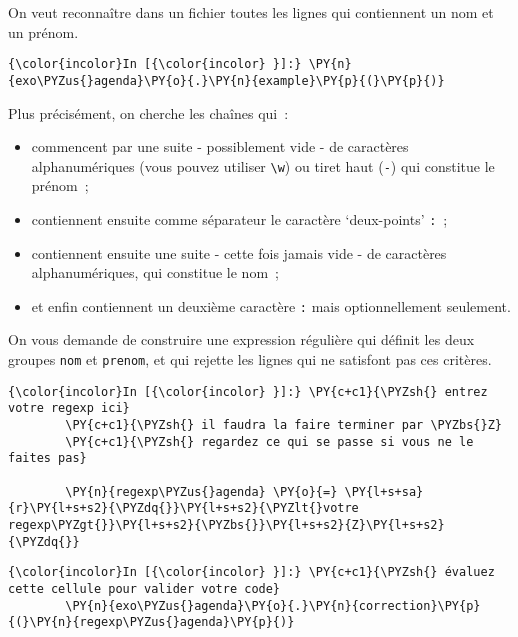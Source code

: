     On veut reconnaître dans un fichier toutes les lignes qui contiennent un
nom et un prénom.

    \begin{Verbatim}[commandchars=\\\{\}]
{\color{incolor}In [{\color{incolor} }]:} \PY{n}{exo\PYZus{}agenda}\PY{o}{.}\PY{n}{example}\PY{p}{(}\PY{p}{)}
\end{Verbatim}


    Plus précisément, on cherche les chaînes qui~:

\begin{itemize}
\tightlist
\item
  commencent par une suite - possiblement vide - de caractères
  alphanumériques (vous pouvez utiliser \texttt{\textbackslash{}w}) ou
  tiret haut (\texttt{-}) qui constitue le prénom~;
\item
  contiennent ensuite comme séparateur le caractère `deux-points'
  \texttt{:}~;
\item
  contiennent ensuite une suite - cette fois jamais vide - de caractères
  alphanumériques, qui constitue le nom~;
\item
  et enfin contiennent un deuxième caractère \texttt{:} mais
  optionnellement seulement.
\end{itemize}

    On vous demande de construire une expression régulière qui définit les
deux groupes \texttt{nom} et \texttt{prenom}, et qui rejette les lignes
qui ne satisfont pas ces critères.

    \begin{Verbatim}[commandchars=\\\{\}]
{\color{incolor}In [{\color{incolor} }]:} \PY{c+c1}{\PYZsh{} entrez votre regexp ici}
        \PY{c+c1}{\PYZsh{} il faudra la faire terminer par \PYZbs{}Z}
        \PY{c+c1}{\PYZsh{} regardez ce qui se passe si vous ne le faites pas}
        
        \PY{n}{regexp\PYZus{}agenda} \PY{o}{=} \PY{l+s+sa}{r}\PY{l+s+s2}{\PYZdq{}}\PY{l+s+s2}{\PYZlt{}votre regexp\PYZgt{}}\PY{l+s+s2}{\PYZbs{}}\PY{l+s+s2}{Z}\PY{l+s+s2}{\PYZdq{}}
\end{Verbatim}


    \begin{Verbatim}[commandchars=\\\{\}]
{\color{incolor}In [{\color{incolor} }]:} \PY{c+c1}{\PYZsh{} évaluez cette cellule pour valider votre code}
        \PY{n}{exo\PYZus{}agenda}\PY{o}{.}\PY{n}{correction}\PY{p}{(}\PY{n}{regexp\PYZus{}agenda}\PY{p}{)}
\end{Verbatim}


